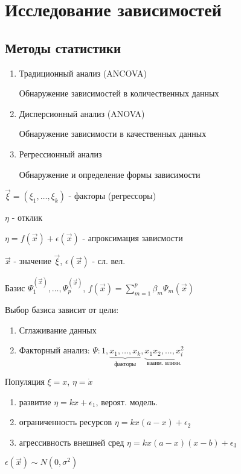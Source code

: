 \documentclass{article}
\begin{document}
\section{Исследование зависимостей}
\subsection{Методы статистики}
\begin{enumerate}
  \item Традиционный анализ (ANCOVA)

    Обнаружение зависимостей в количественных данных
  \item Дисперсионный анализ (ANOVA)

    Обнаружение зависимости в качественных данных
  \item Регрессионный анализ

    Обнаружение и определение формы зависимости
\end{enumerate}

\hr
$\vec{\xi}=(\xi_1,\dots ,\xi_k)$ - факторы (регрессоры)

$\eta$ - отклик 

$\eta = f(\vec x)+\epsilon(\vec x)$ - апроксимация зависмости

$\vec{x}$ - значение $\vec{\xi}$, $\epsilon(\vec{x})$ - сл. вел.

Базис $\Psi_1^{(\vec{x})},\dots ,\Psi_p^{(\vec{x})}$, $f(\vec{x})=\sum_{m=1}^{p}\beta_m\Psi_m(\vec{x})$

Выбор базиса зависит от цели:
\begin{enumerate}
  \item Сглаживание данных
  \item Факторный анализ: $\Psi: 1,\underbrace{x_1,\dots ,x_k}_{\text{факторы}},\underbrace{x_1x_2,\dots, x_i^2}_{\text{взаим. влиян.}} $
\end{enumerate}
\begin{eg}
  Популяция $\xi=x$, $\eta=\dot{x}$
  \begin{enumerate}
    \item развитие $\eta=kx+\epsilon_1$, вероят. модель.
    \item ограниченность ресурсов $\eta=kx(a-x)+\epsilon_2$
    \item агрессивность внешней сред $\eta=kx(a-x)(x-b)+\epsilon_3$
  \end{enumerate}
\end{eg}
$\epsilon(\vec{x})\sim N(0, \sigma^{2})$
\end{document}
